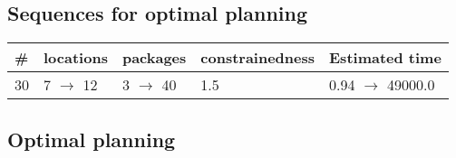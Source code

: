 \documentclass{article}
\begin{document}
                            \subsection*{Sequences for optimal planning}

                            \begin{center}
                            \begin{tabular}{@{}l|l|l|l|l@{}}
                            \# & locations & packages & constrainedness & Estimated time\\\midrule
                            30&7 $\rightarrow$ 12&3 $\rightarrow$ 40&1.5&0.94 $\rightarrow$ 49000.0
                            \end{tabular}
                            \end{center}
                    
                                \subsection*{Optimal planning}
                                
\end{document}

